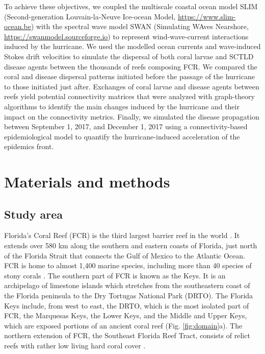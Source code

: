 \documentclass[fleqn,10pt]{wlscirep}
\newcommand{\modif}[1]{{#1}}
\begin{document}
To achieve these objectives, we coupled the multiscale coastal ocean model SLIM (Second-generation Louvain-la-Neuve Ice-ocean Model, \href{https://www.slim-ocean.be}{https://www.slim-ocean.be}) \citep{Lambrechts2008,Frys2020} with the spectral wave model SWAN (Simulating WAves Nearshore, \href{https://swanmodel.sourceforge.io}{https://swanmodel.sourceforge.io}) \citep{Booij1999Apr,DobbyIrma} to represent wind-wave-current interactions induced by the hurricane. We used the modelled ocean currents and wave-induced Stokes drift velocities to simulate the dispersal of both coral larvae and SCTLD disease agents between the thousands of reefs composing FCR. We compared the coral and disease dispersal patterns initiated before the passage of the hurricane to those initiated just after. Exchanges of coral larvae and disease agents between reefs yield \modif{potential} connectivity matrices that were analyzed with graph-theory algorithms to identify the main changes induced by the hurricane and their impact on the connectivity metrics. Finally, we simulated the disease propagation between September 1, 2017, and December 1, 2017 using a connectivity-based epidemiological model \citep{DobbySCTLD} to quantify the hurricane-induced acceleration of the epidemics front.


\section{Materials and methods}
\subsection{Study area}
Florida's Coral Reef (FCR) is the third largest barrier reef in the world \citep{Finkl2008Jul}. It extends over 580 km along the southern and eastern coasts of Florida, just north of the Florida Strait that connects the Gulf of Mexico to the Atlantic Ocean. FCR is home to almost 1,400 marine species, including more than 40 species of stony corals \citep{Banks2008}. The southern part of FCR is known as the Keys. It is an archipelago of limestone islands which stretches from the southeastern coast of the Florida peninsula to the Dry Tortugas National Park (DRTO). The Florida Keys include, from west to east, the DRTO, which is the most isolated part of FCR, the Marquesas Keys, the Lower Keys, and the Middle and Upper Keys, which are exposed portions of an ancient coral reef (Fig. \ref{fig:domain}a). The northern extension of FCR, the Southeast Florida Reef Tract, consists \modif{of} relict reefs with rather low living hard coral cover \citep{Hoffmeister1968Nov,Banks2008}.
\end{document}
